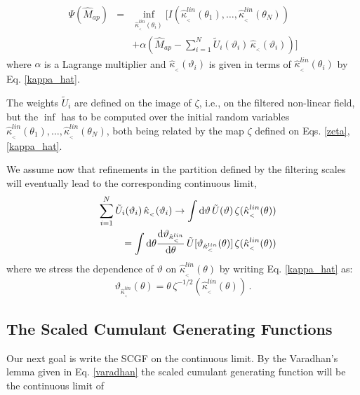 \documentclass[twocolumn,aps,reprint, nofootinbib]{revtex4}
\newcommand{\dd}{{\rm d}}
\newcommand{\hkappa}{\hat{\kappa}_{_<}}
\newcommand{\tU}{\tilde{U}}
\newcommand{\vark}{\vartheta_{\hkappa^{lin}}}
\newcommand{\Map}{\hat{M}_{ap}}
\begin{document}
\begin{eqnarray}
\Psi(\Map) & = & \inf_{\hkappa^{lin}(\theta_i)}  \Bigg[ I(\hkappa^{lin}(\theta_1), \ldots, \hkappa^{lin}(\theta_N)) \nonumber\\ & & + \alpha \left(\Map - \sum_{i=1}^N \tU_i(\vartheta_i) \, \hkappa (\vartheta_i) \right)\Bigg]
\end{eqnarray}
where $\alpha$ is a Lagrange multiplier and $\hkappa(\vartheta_i)$ is given in terms of $\hkappa^{lin}(\theta_i)$ by Eq. \eqref{kappa_hat}.

The weights $\tU_i$ are defined on the image of $\zeta$, i.e., on the filtered non-linear field, but the $\inf$ has to be computed over the initial random variables $\hkappa^{lin}(\theta_1), \ldots, \hkappa^{lin}(\theta_N)$, both being related by the map $\zeta$ defined on Eqs. \eqref{zeta}, \eqref{kappa_hat}.

We assume now that refinements in the partition defined by the filtering scales will eventually lead to the corresponding continuous limit,
\begin{eqnarray}
& & \sum_{i=1}^N \tU_i(\vartheta_i) \, \hkappa (\vartheta_i) \to \int \dd \vartheta \, \tU(\vartheta) \, \zeta(\hkappa^{lin}(\theta))
\nonumber\\ 
&  & =  \int \dd \theta  \frac{ \dd \vark }{\dd \theta} \, \tU [\vark (\theta)] \, \zeta(\hkappa^{lin} (\theta))
\end{eqnarray}
where we stress the dependence of $\vartheta$ on $\hkappa^{lin}(\theta)$  by writing Eq. \eqref{kappa_hat} as:
\begin{equation}
\label{vark}
\vark (\theta) = \theta \, \zeta^{-1/2}(\hkappa^{lin}(\theta)) \, .
\end{equation}

\subsection{The Scaled Cumulant Generating Functions}

Our next goal is write the SCGF on the continuous limit. By the Varadhan's lemma given in Eq. \eqref{varadhan} the scaled cumulant generating function will be the continuous limit of
\end{document}

